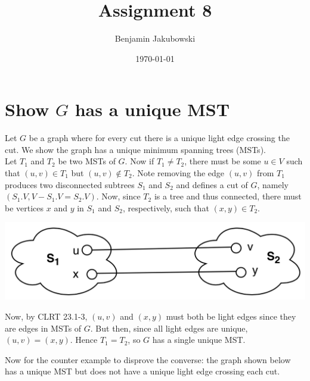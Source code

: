 \documentclass[paper=a4, fontsize=11pt]{scrartcl} %
\title{	Assignment 8}
\author{Benjamin Jakubowski} %
\date{\normalsize\today} %
\numberwithin{equation}{section} %
\numberwithin{figure}{section} %
\numberwithin{table}{section} %
\begin{document}
\maketitle %

\section{Show $G$ has a unique MST}

Let $G$ be a graph where for every cut there is a unique light edge crossing the cut. We show the graph has a unique minimum spanning trees (MSTs).\\

Let $T_1$ and $T_2$ be two MSTs of $G$. Now if $T_1 \ne T_2$, there must be some $u \in V$ such that $(u, v) \in T_1$ but $(u, v) \notin T_2$. Note removing the edge $(u,v)$ from $T_1$ produces two disconnected subtrees $S_1$ and $S_2$ and defines a cut of $G$, namely $(S_1.V, V - S_1.V = S_2.V)$. Now, since $T_2$ is a tree and thus connected, there must be vertices $x$ and $y$ in $S_1$ and $S_2$, respectively, such that $(x,y) \in T_2$.
\begin{center}
\includegraphics[scale=0.6]{figures/HW8-1.png}
\end{center}
Now, by CLRT 23.1-3, $(u,v)$ and $(x,y)$ must both be light edges since they are edges in MSTs of $G$. But then, since all light edges are unique, $(u,v) = (x,y)$. Hence $T_1 = T_2$, so $G$ has a single unique MST.

Now for the counter example to disprove the converse: the graph shown below has a unique MST but does not have a unique light edge crossing each cut.

\begin{center}
\end{center}
\end{document}
